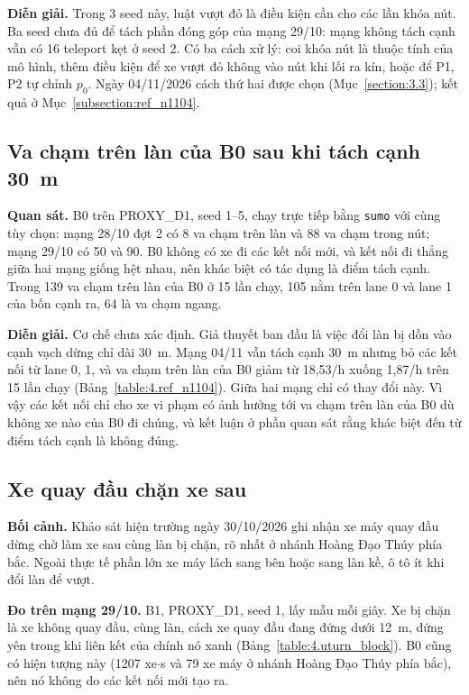 \documentclass[../main.tex]{subfiles}
\begin{document}
\textbf{Diễn giải.} Trong 3 seed này, luật vượt đỏ là điều kiện cần cho các lần khóa nút. Ba seed chưa đủ để tách phần đóng góp của mạng 29/10: mạng không tách cạnh vẫn có 16 teleport kẹt ở seed 2. Có ba cách xử lý: coi khóa nút là thuộc tính của mô hình, thêm điều kiện để xe vượt đỏ không vào nút khi lối ra kín, hoặc để P1, P2 tự chỉnh $p_0$. Ngày 04/11/2026 cách thứ hai được chọn (Mục~\ref{section:3.3}); kết quả ở Mục~\ref{subsection:ref_n1104}.

\subsection{Va chạm trên làn của B0 sau khi tách cạnh 30~m}
\label{subsection:split_collisions}

\textbf{Quan sát.} B0 trên PROXY\_D1, seed 1--5, chạy trực tiếp bằng \texttt{sumo} với cùng tùy chọn: mạng 28/10 đợt 2 có 8 va chạm trên làn và 88 va chạm trong nút; mạng 29/10 có 50 và 90. B0 không có xe đi các kết nối mới, và kết nối đi thẳng giữa hai mạng giống hệt nhau, nên khác biệt có tác dụng là điểm tách cạnh. Trong 139 va chạm trên làn của B0 ở 15 lần chạy, 105 nằm trên lane 0 và lane 1 của bốn cạnh ra, 64 là va chạm ngang.

\textbf{Diễn giải.} Cơ chế chưa xác định. Giả thuyết ban đầu là việc đổi làn bị dồn vào cạnh vạch dừng chỉ dài 30~m. Mạng 04/11 vẫn tách cạnh 30~m nhưng bỏ các kết nối từ lane 0, 1, và va chạm trên làn của B0 giảm từ 18,53/h xuống 1,87/h trên 15 lần chạy (Bảng~\ref{table:4.ref_n1104}). Giữa hai mạng chỉ có thay đổi này. Vì vậy các kết nối chỉ cho xe vi phạm có ảnh hưởng tới va chạm trên làn của B0 dù không xe nào của B0 đi chúng, và kết luận ở phần quan sát rằng khác biệt đến từ điểm tách cạnh là không đúng.

\subsection{Xe quay đầu chặn xe sau}
\label{subsection:uturn}

\textbf{Bối cảnh.} Khảo sát hiện trường ngày 30/10/2026 ghi nhận xe máy quay đầu dừng chờ làm xe sau cùng làn bị chặn, rõ nhất ở nhánh Hoàng Đạo Thúy phía bắc. Ngoài thực tế phần lớn xe máy lách sang bên hoặc sang làn kề, ô tô ít khi đổi làn để vượt.

\textbf{Đo trên mạng 29/10.} B1, PROXY\_D1, seed 1, lấy mẫu mỗi giây. Xe bị chặn là xe không quay đầu, cùng làn, cách xe quay đầu đang đứng dưới 12~m, đứng yên trong khi liên kết của chính nó xanh (Bảng~\ref{table:4.uturn_block}). B0 cũng có hiện tượng này (1207 xe$\cdot$s và 79 xe máy ở nhánh Hoàng Đạo Thúy phía bắc), nên nó không do các kết nối mới tạo ra.
\end{document}
